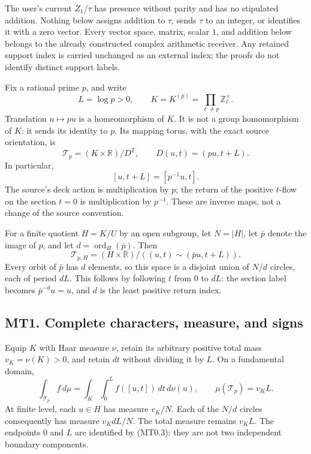The user's current \(Z_1/\tau\) has presence without parity and has no
stipulated addition. Nothing below assigns addition to \(\tau\), sends
\(\tau\) to an integer, or identifies it with a zero vector. Every
vector space, matrix, scalar \(1\), and addition below belongs to the
already constructed complex arithmetic receiver. Any retained support
index is carried unchanged as an external index; the proofs do not
identify distinct support labels.

Fix a rational prime \(p\), and write \[
 L=\log p>0,\qquad K=K^{(p)}=\prod_{\ell\ne p}\mathbb Z_\ell^\times.
\tag{MT0.1}
\] Translation \(u\mapsto pu\) is a homeomorphism of \(K\). It is not a
group homomorphism of \(K\): it sends its identity to \(p\). Its mapping
torus, with the exact source orientation, is \[
 \mathcal T_p=(K\times\mathbb R)/D^{\mathbb Z},\qquad
 D(u,t)=(pu,t+L).
\tag{MT0.2}
\] In particular, \[
 [u,t+L]=[p^{-1}u,t].
\tag{MT0.3}
\] The source's deck action is multiplication by \(p\); the return of
the positive \(t\)-flow on the section \(t=0\) is multiplication by
\(p^{-1}\). These are inverse maps, not a change of the source
convention.

For a finite quotient \(H=K/U\) by an open subgroup, let \(N=|H|\), let
\(\bar p\) denote the image of \(p\), and let
\(d=\operatorname{ord}_H(\bar p)\). Then \[
 \mathcal T_{p,H}=(H\times\mathbb R)/
 ((u,t)\sim(\bar p u,t+L)).
\tag{MT0.4}
\] Every orbit of \(\bar p\) has \(d\) elements, so this space is a
disjoint union of \(N/d\) circles, each of period \(dL\). This follows
by following \(t\) from \(0\) to \(dL\): the section label becomes
\(\bar p^{-d}u=u\), and \(d\) is the least positive return index.

\subsection{MT1. Complete characters, measure, and
signs}\label{mt1.-complete-characters-measure-and-signs}

Equip \(K\) with Haar measure \(\nu\), retain its arbitrary positive
total mass \(v_K=\nu(K)>0\), and retain \(dt\) without dividing it by
\(L\). On a fundamental domain, \[
 \int_{\mathcal T_p} f\,d\mu
  =\int_K\int_0^L f([u,t])\,dt\,d\nu(u),
 \qquad \mu(\mathcal T_p)=v_KL.
\tag{MT1.1}
\] At finite level, each \(u\in H\) has measure \(v_K/N\). Each of the
\(N/d\) circles consequently has measure \(v_KdL/N\). The total measure
remains \(v_KL\). The endpoints \(0\) and \(L\) are identified by
(MT0.3); they are not two independent boundary components.

